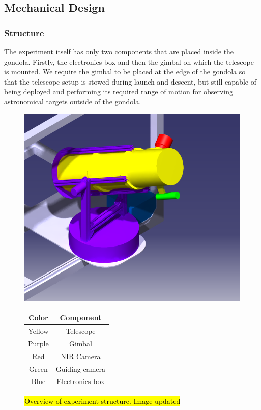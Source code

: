 \newpage
\subsection{Mechanical Design} \label{Mechanical_Design}
\label{sec:mechanical-design}

\subsubsection{Structure}
\label{sec:4.4.1}
The experiment itself has only two components that are placed inside the gondola. Firstly, the electronics box and then the gimbal on which the telescope is mounted. We require the gimbal to be placed at the edge of the gondola so that the telescope setup is stowed during launch and descent, but still capable of being deployed and performing its required range of motion for observing astronomical targets outside of the gondola.

\begin{figure}[H]
   \begin{minipage}[t]{0.6\textwidth}   
	\includegraphics[scale=1.4]{4-experiment-design/img/mechanical/Assembly_v3iso.png}
	\caption{\hl{Overview of experiment structure. Image updated}}
	\label{fig::mechanical::IsoView1}
	\end{minipage}
	\hfill
	\begin{minipage}[t]{0.4\textwidth}
	\vspace{-5cm}	
	\begin{tabular}{c | c}
	Color & Component \\ \hline
	Yellow & Telescope\\
	Purple & Gimbal\\
	Red & NIR Camera\\
	Green & Guiding camera\\
	Blue & Electronics box\\	
	\end{tabular}	
\end{minipage}		 
\end{figure}


